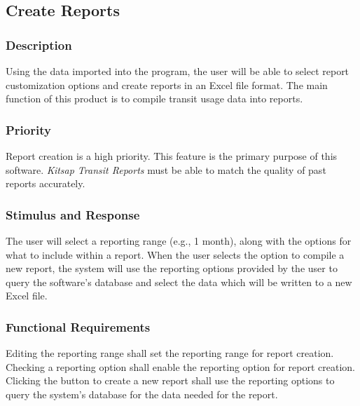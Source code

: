 \subsection{Create Reports}
\subsubsection{Description}
Using the data imported into the program, the user will be able to select report customization options and create reports in an Excel file format. The main function of this product is to compile transit usage data into reports.

\subsubsection{Priority}
Report creation is a high priority. This feature is the primary purpose of this software. \textit{Kitsap Transit Reports} must be able to match the quality of past reports accurately.

\subsubsection{Stimulus and Response}
The user will select a reporting range (e.g., 1 month), along with the options for what to include within a report. When the user selects the option to compile a new report, the system will use the reporting options provided by the user to query the software's database and select the data which will be written to a new Excel file.

\subsubsection{Functional Requirements}
Editing the reporting range shall set the reporting range for report creation.\\

Checking a reporting option shall enable the reporting option for report creation.\\

Clicking the button to create a new report shall use the reporting options to query the system's database for the data needed for the report.\\

